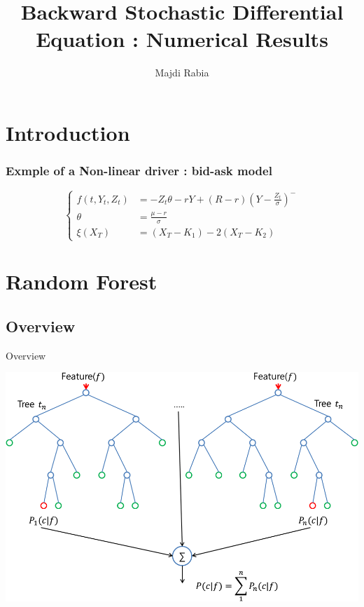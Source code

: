 \documentclass[10pt]{beamer}
\begin{document}
 
\title{\textbf{Backward Stochastic Differential Equation : Numerical Results}}
\author{ Majdi Rabia}
\maketitle



\section{Introduction}

\begin{frame}
	\frametitle{Exmple of a Non-linear driver : bid-ask model}
	\[
	\left\{
	\begin{aligned}
	f(t,Y_t,Z_t) & =  -Z_t\theta  - rY + (R-r)(Y-\frac{Z_t}{\sigma})^-\\
	\theta &= \frac{\mu - r}{\sigma}\\
	\xi(X_T) & = (X_T - K_1) - 2(X_T - K_2)
	\end{aligned}
	\right.
	\]
	
	
\end{frame}


\section{Random Forest}

\subsection{Overview}

\begin{frame}{Overview}
	
	
	\centering
	\includegraphics[scale=0.2]{rf_general.png}
\end{frame}
\end{document}
